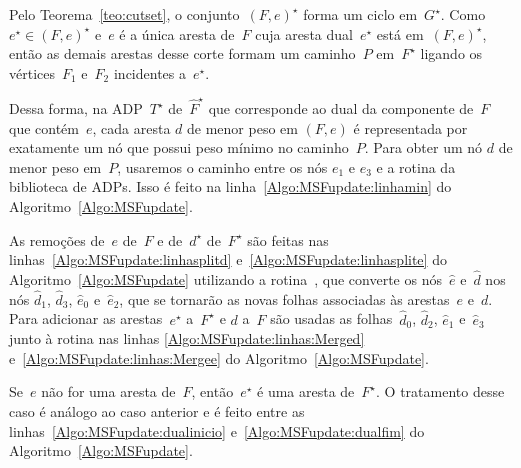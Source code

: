 Pelo Teorema~\ref{teo:cutset}, o conjunto~$(F, e)^\star$ forma um ciclo em~$G^\star$.
Como~$e^\star \in (F, e)^\star$ e~$e$ é a única aresta de~$F$ cuja aresta dual~$e^\star$ está em~$(F, e)^\star$, então as demais arestas desse corte formam um caminho~$P$ em~$F^\star$ ligando os vértices~$F_1$ e~$F_2$ incidentes a~$e^\star$.

Dessa forma, na ADP~$T^\star$ de~$\hat F^\star$ que corresponde ao dual da componente de~$F$ que contém~$e$, cada aresta $d$ de menor peso em $(F, e)$ é representada por exatamente um nó que possui peso mínimo no caminho~$P$.
Para obter um nó $d$ de menor peso em~$P$, usaremos o caminho entre os nós $e_1$ e $e_3$ e a rotina \LCOMin{} da biblioteca de ADPs.
Isso é feito na linha~\ref{Algo:MSFupdate:linhamin} do Algoritmo~\ref{Algo:MSFupdate}.

As remoções de~$e$ de~$F$ e de~$d^\star$ de~$F^\star$ são feitas nas linhas~\ref{Algo:MSFupdate:linhasplitd} e~\ref{Algo:MSFupdate:linhasplite} do Algoritmo~\ref{Algo:MSFupdate} utilizando a rotina~\LCOSplit{}, que converte os nós~$\hat e$ e~$\hat d$ nos nós $\hat d_1$, $\hat d_3$, $\hat e_0$ e~$\hat e_2$, que se tornarão as novas folhas associadas às arestas~$e$ e~$d$.
Para adicionar as arestas~$e^\star$ a~$F^\star$ e $d$ a~$F$ são usadas as folhas~$\hat d_0$, $\hat d_2$, $\hat e_1$ e~$\hat e_3$ junto à rotina \LCOMerge{} nas linhas \ref{Algo:MSFupdate:linhas:Merged} e~\ref{Algo:MSFupdate:linhas:Mergee} do Algoritmo~\ref{Algo:MSFupdate}.

Se~$e$ não for uma aresta de~$F$, então~$e^\star$ é uma aresta de~$F^\star$.
O tratamento desse caso é análogo ao caso anterior e é feito entre as linhas~\ref{Algo:MSFupdate:dualinicio} e~\ref{Algo:MSFupdate:dualfim} do Algoritmo~\ref{Algo:MSFupdate}.

